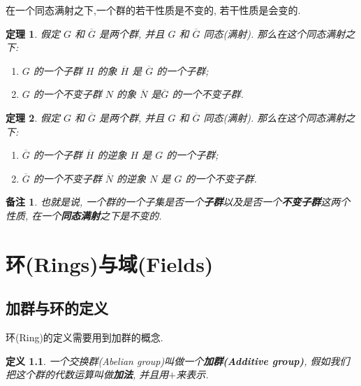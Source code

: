 \documentclass[utf8]{ctexbook}
\newtheorem{theorem}{定理}[section]
\newtheorem{definition}{定义}[section]
\newtheorem{memo}{备注}[section]
\begin{document}
在一个同态满射之下,一个群的若干性质是不变的, 若干性质是会变的.


\begin{theorem}\label{theorem_subgroup_image_homomorphism_invariance}
假定 $G$ 和 $\overline{G}$ 是两个群, 并且 $G$ 和 $\overline{G}$ 同态(满射). 那么在这个同态满射之下:
\begin{enumerate}
\item{$G$ 的一个子群 $H$ 的象 $\overline{H}$ 是 $\overline{G}$ 的一个子群;}
\item{$G$ 的一个不变子群 $N$ 的象 $\overline{N}$ 是$\overline{G}$ 的一个不变子群.}
\end{enumerate}

\end{theorem}

\begin{theorem}\label{theorem_subgroup_preimage_homomorphism_invariance}
假定 $G$ 和 $\overline{G}$ 是两个群, 并且 $G$ 和 $\overline{G}$ 同态(满射). 那么在这个同态满射之下:
\begin{enumerate}
\item{$\overline{G}$ 的一个子群 $\overline{H}$ 的逆象 $H$ 是 $G$ 的一个子群;}
\item{$\overline{G}$ 的一个不变子群 $\overline{N}$ 的逆象 $N$ 是 $G$ 的一个不变子群.}
\end{enumerate}

\end{theorem}

\begin{memo}

也就是说, 一个群的一个子集是否一个\textbf{子群}以及是否一个\textbf{不变子群}这两个性质, 在一个\textbf{同态满射}之下是不变的.
\end{memo}


\chapter{环(Rings)与域(Fields)}

\section{加群与环的定义}

环(Ring)的定义需要用到加群的概念.

\begin{definition}
一个交换群(Abelian group)叫做一个\textbf{加群(Additive group)}, 假如我们把这个群的代数运算叫做\textbf{加法}, 并且用$+$来表示.
\end{definition}
\end{document}
